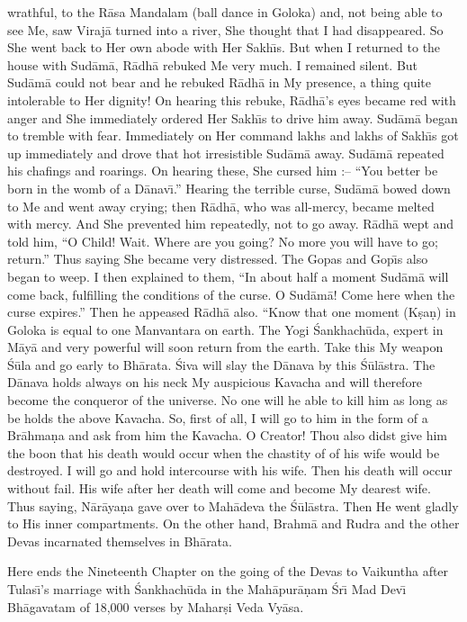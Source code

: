 wrathful, to the R\=asa Mandalam (ball dance in Goloka) and, not being able to see Me, saw Viraj\=a turned into a river, She thought that I had disappeared. So She went back to Her own abode with Her Sakh\={\i}s. But when I returned to the house with Sud\=am\=a, R\=adh\=a rebuked Me very much. I remained silent. But Sud\=am\=a could not bear and he rebuked R\=adh\=a in My presence, a thing quite intolerable to Her dignity! On hearing this rebuke, R\=adh\=a's eyes became red with anger and She immediately ordered Her Sakh\={\i}s to drive him away. Sud\=am\=a began to tremble with fear. Immediately on Her command lakhs and lakhs of Sakh\={\i}s got up immediately and drove that hot irresistible Sud\=am\=a away. Sud\=am\=a repeated his chafings and roarings. On hearing these, She cursed him :-- ``You better be born in the womb of a D\=anav\={\i}.'' Hearing the terrible curse, Sud\=am\=a bowed down to Me and went away crying; then R\=adh\=a, who was all-mercy, became melted with mercy. And She prevented him repeatedly, not to go away. R\=adh\=a wept and told him, ``O Child! Wait. Where are you going? No more you will have to go; return.'' Thus saying She became very distressed. The Gopas and Gop\={\i}s also began to weep. I then explained to them, ``In about half a moment Sud\=am\=a will come back, fulfilling the conditions of the curse. O Sud\=am\=a! Come here when the curse expires.'' Then he appeased R\=adh\=a also. ``Know that one moment (K\d{s}a\d{n}) in Goloka is equal to one Manvantara on earth. The Yogi \'Sankhach\=uda, expert in M\=ay\=a and very powerful will soon return from the earth. Take this My weapon \'S\=ula and go early to Bh\=arata. \'Siva will slay the D\=anava by this \'S\=ul\=astra. The D\=anava holds always on his neck My auspicious Kavacha and will therefore become the conqueror of the universe. No one will he able to kill him as long as be holds the above Kavacha. So, first of all, I will go to him in the form of a Br\=ahma\d{n}a and ask from him the Kavacha. O Creator! Thou also didst give him the boon that his death would occur when the chastity of of his wife would be destroyed. I will go and hold intercourse with his wife. Then his death will occur without fail. His wife after her death will come and become My dearest wife. Thus saying, N\=ar\=aya\d{n}a gave over to Mah\=adeva the \'S\=ul\=astra. Then He went gladly to His inner compartments. On the other hand, Brahm\=a and Rudra and the other Devas incarnated themselves in Bh\=arata.

Here ends the Nineteenth Chapter on the going of the Devas to Vaikuntha after Tulas\={\i}'s marriage with \'Sankhach\=uda in the Mah\=apur\=a\d{n}am \'Sr\={\i} Mad Dev\={\i} Bh\=agavatam of 18,000 verses by Mahar\d{s}i Veda Vy\=asa.



